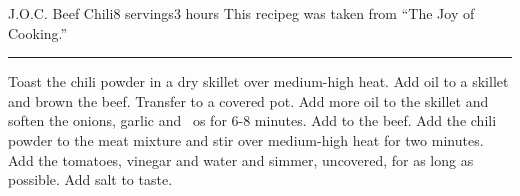 \begin{recipe}{J.O.C. Beef Chili}{8 servings}{3 hours}
\freeform This recipeg was taken from ``The Joy of Cooking.''\\
\rule{\textwidth}{0.05pt}
Toast the chili powder in a dry skillet over medium-high heat.
Add oil to a skillet and brown the beef.  Transfer to a covered pot. 
Add more oil to the skillet and soften the onions, garlic and ~os for 6-8 minutes.  Add to the beef.
\newstep
Add the chili powder to the meat mixture and stir over medium-high heat for two minutes.
Add the tomatoes, vinegar and water and simmer, uncovered, for as long as possible.  Add salt to taste.
\end{recipe}
